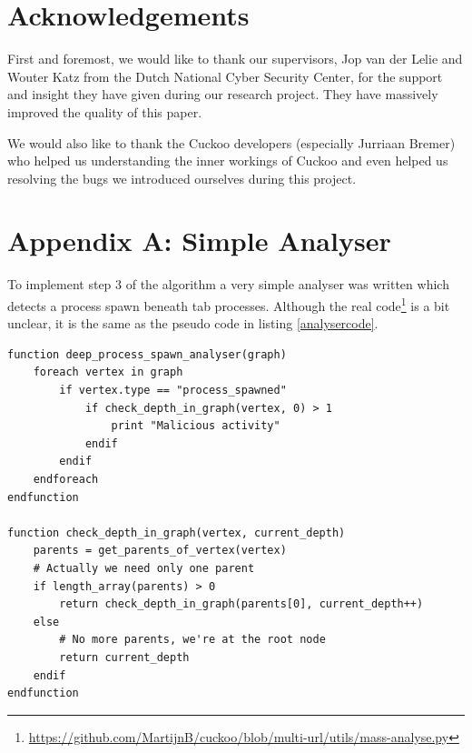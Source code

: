 \documentclass{scrartcl}
\begin{document}
\clearpage

\section*{Acknowledgements}

First and foremost, we would like to thank our supervisors, Jop van der Lelie and Wouter Katz from the Dutch National Cyber Security Center, for the support and insight they have given during our research project. They have massively improved the quality of this paper.

We would also like to thank the Cuckoo developers (especially Jurriaan Bremer) who helped us understanding the inner workings of Cuckoo and even helped us resolving the bugs we introduced ourselves during this project.

\clearpage




\clearpage

\section*{Appendix A: Simple Analyser}

To implement step 3 of the algorithm a very simple analyser was written which detects a process spawn beneath tab processes. Although the real code\footnote{\url{https://github.com/MartijnB/cuckoo/blob/multi-url/utils/mass-analyse.py}} is a bit unclear, it is the same as the pseudo code in listing \ref{analysercode}.

\begin{lstlisting}[caption={Pseudo code for phase 3 of the algorithm},label={analysercode}]
function deep_process_spawn_analyser(graph)
    foreach vertex in graph
        if vertex.type == "process_spawned"
            if check_depth_in_graph(vertex, 0) > 1
                print "Malicious activity"
            endif
        endif
    endforeach
endfunction

function check_depth_in_graph(vertex, current_depth)
    parents = get_parents_of_vertex(vertex)
    # Actually we need only one parent
    if length_array(parents) > 0
        return check_depth_in_graph(parents[0], current_depth++)
    else
        # No more parents, we're at the root node
        return current_depth
    endif
endfunction
\end{lstlisting}
\end{document}
